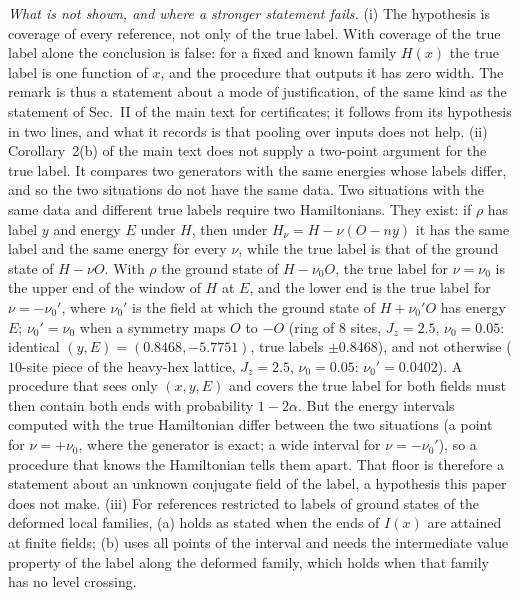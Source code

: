 \documentclass[aps,prx,onecolumn,10pt,nofootinbib,longbibliography,floatfix]{revtex4-2}
\theoremstyle{remark}
\newcommand{\Jz}{J_z}
\begin{document}
\emph{What is not shown, and where a stronger statement fails.} (i) The hypothesis is coverage of every reference,
not only of the true label. With coverage of the true label alone the conclusion is false: for a fixed and known
family $H(x)$ the true label is one function of $x$, and the procedure that outputs it has zero width. The
remark is thus a statement about a mode of justification, of the same kind as the statement of Sec.~II of the main
text for certificates; it follows from its hypothesis in two lines, and what it records is that pooling over inputs
does not help.
(ii) Corollary~2(b) of the main text does not supply a two-point argument for the true label. It compares two generators with the %
same energies whose labels differ, and so the two situations do not have the same data. Two situations with the
same data and different true labels require two Hamiltonians. They exist: if $\rho$ has label $y$ and energy $E$
under $H$, then under $H_\nu=H-\nu(O-ny)$ it has the same label and the same energy for every $\nu$, while the
true label is that of the ground state of $H-\nu O$. With $\rho$ the ground state of $H-\nu_0O$, the true label
for $\nu=\nu_0$ is the upper end of the window of $H$ at $E$, and the lower end is the true label for
$\nu=-\nu_0'$, where $\nu_0'$ is the field at which the ground state of $H+\nu_0'O$ has energy $E$; $\nu_0'=\nu_0$
when a symmetry maps $O$ to $-O$ (ring of $8$ sites, $\Jz=2.5$, $\nu_0=0.05$: identical $(y,E)=(0.8468,-5.7751)$, %
true labels $\pm0.8468$), and not otherwise ($10$-site piece of the heavy-hex lattice, $\Jz=2.5$, $\nu_0=0.05$: %
$\nu_0'=0.0402$). A procedure that sees only $(x,y,E)$ and covers the true label for both fields must then contain %
both ends with probability $1-2\alpha$. But the energy intervals computed with the true Hamiltonian differ
between the two situations (a point for $\nu=+\nu_0$, where the generator is exact; a wide interval for
$\nu=-\nu_0'$), so a procedure that knows the Hamiltonian tells them apart. That floor is therefore a statement
about an unknown conjugate field of the label, a hypothesis this paper does not make.
(iii) For references restricted to labels of ground states of the deformed local families, (a) holds as stated
when the ends of $I(x)$ are attained at finite fields; (b) uses all points of the interval and needs the
intermediate value property of the label along the deformed family, which holds when that family has no level
crossing.
\end{document}
